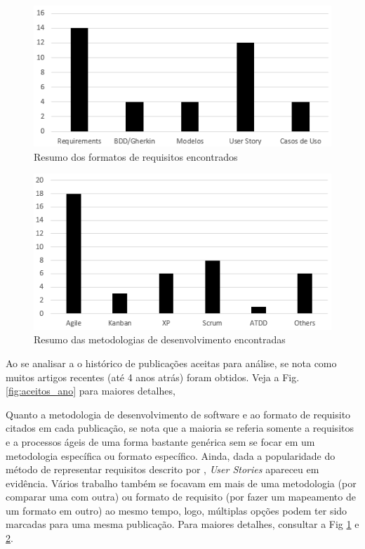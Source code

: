 \begin{figure}[!t]
\captionsetup{justification=centering}
\centering
\includegraphics[scale=0.6]{images/Aceitos_formatos}
\caption{Resumo dos formatos de requisitos encontrados}
\label{fig:aceitos_formatos}
\end{figure}

\begin{figure}[!t]
\captionsetup{justification=centering}
\centering
\includegraphics[scale=0.6]{images/Aceitos_metodologias}
\caption{Resumo das metodologias de desenvolvimento encontradas}
\label{fig:aceitos_metodologias}
\end{figure}

Ao se analisar a o histórico de publicações aceitas para análise, se nota como muitos artigos recentes (até 4 anos atrás) foram obtidos. Veja a Fig. \ref{fig:aceitos_ano} para maiores detalhes,

Quanto a metodologia de desenvolvimento de software e ao formato de requisito citados em cada publicação, se nota que a maioria se referia somente a requisitos e a processos ágeis de uma forma bastante genérica sem se focar em um metodologia específica ou formato específico. Ainda, dada a popularidade do método de representar requisitos descrito por \cite{Cohn_2004}, \textit{User Stories} apareceu em evidência. Vários trabalho também se focavam em mais de uma metodologia (por comparar uma com outra) ou formato de requisito (por fazer um mapeamento de um formato em outro) ao mesmo tempo, logo, múltiplas opções podem ter sido marcadas para uma mesma publicação. Para maiores detalhes, consultar a Fig \ref{fig:aceitos_formatos} e \ref{fig:aceitos_metodologias}.

